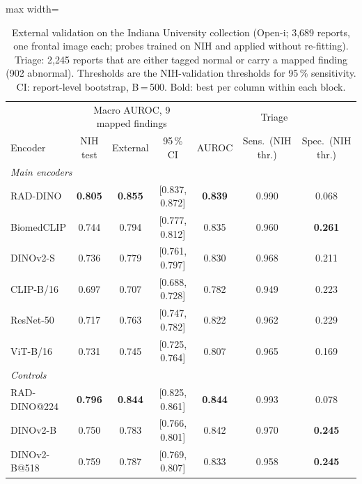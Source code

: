 \begin{table}[H]\centering
\scriptsize
\caption{External validation on the Indiana University collection (Open-i; 3,689 reports, one frontal image each; probes trained on NIH and applied without re-fitting). Triage: 2,245 reports that are either tagged normal or carry a mapped finding (902 abnormal). Thresholds are the NIH-validation thresholds for 95\,\% sensitivity. CI: report-level bootstrap, B\,=\,500. Bold: best per column within each block.}\label{tab:external}
\begin{adjustbox}{max width=\linewidth}
\begin{tabular}{lcccccc}
\toprule
 & \multicolumn{3}{c}{Macro AUROC, 9 mapped findings} & \multicolumn{3}{c}{Triage} \\ Encoder & NIH test & External & 95\,\% CI & AUROC & Sens.\ (NIH thr.) & Spec.\ (NIH thr.) \\
\midrule

\multicolumn{7}{l}{\emph{Main encoders}} \\
RAD-DINO & \textbf{0.805} & \textbf{0.855} & [0.837, 0.872] & \textbf{0.839} & 0.990 & 0.068 \\
BiomedCLIP & 0.744 & 0.794 & [0.777, 0.812] & 0.835 & 0.960 & \textbf{0.261} \\
DINOv2-S & 0.736 & 0.779 & [0.761, 0.797] & 0.830 & 0.968 & 0.211 \\
CLIP-B/16 & 0.697 & 0.707 & [0.688, 0.728] & 0.782 & 0.949 & 0.223 \\
ResNet-50 & 0.717 & 0.763 & [0.747, 0.782] & 0.822 & 0.962 & 0.229 \\
ViT-B/16 & 0.731 & 0.745 & [0.725, 0.764] & 0.807 & 0.965 & 0.169 \\
\midrule
\multicolumn{7}{l}{\emph{Controls}} \\
RAD-DINO@224 & \textbf{0.796} & \textbf{0.844} & [0.825, 0.861] & \textbf{0.844} & 0.993 & 0.078 \\
DINOv2-B & 0.750 & 0.783 & [0.766, 0.801] & 0.842 & 0.970 & \textbf{0.245} \\
DINOv2-B@518 & 0.759 & 0.787 & [0.769, 0.807] & 0.833 & 0.958 & \textbf{0.245} \\
\bottomrule
\end{tabular}
\end{adjustbox}
\end{table}
